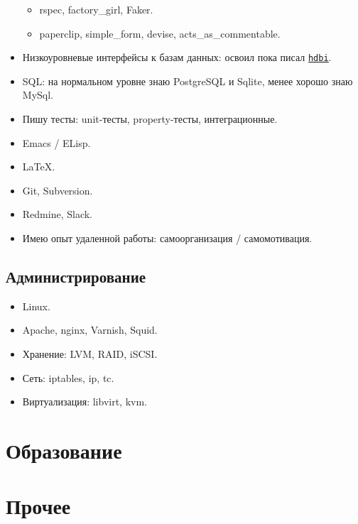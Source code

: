 \documentclass[11pt,a4paper,sans]{moderncv}
\newcommand*{\nlink}[2]{\textcolor{blue}{\texttt{\underline{\href{#1}{#2}}}}}
\begin{document}
\begin{itemize}
\begin{itemize}
  \item rspec, factory\_girl, Faker.
  \item paperclip, simple\_form, devise, acts\_as\_commentable.
  \end{itemize}
\item Низкоуровневые интерфейсы к базам данных: освоил пока писал
  \nlink{http://hackage.haskell.org/package/hdbi}{hdbi}.
\item SQL: на нормальном уровне знаю PostgreSQL и Sqlite, менее хорошо
  знаю MySql.
\item Пишу тесты: unit-тесты, property-тесты, интеграционные.
\item Emacs / ELisp.
\item \LaTeX.
\item Git, Subversion.
\item Redmine, Slack.
\item Имею опыт удаленной работы: самоорганизация / самомотивация.
\end{itemize}

\subsection{Администрирование}

\begin{itemize}
\item Linux.
\item Apache, nginx, Varnish, Squid.
\item Хранение: LVM, RAID, iSCSI.
\item Сеть: iptables, ip, tc.
\item Виртуализация: libvirt, kvm.
\end{itemize}

\section{Образование}


\section{Прочее}

\nocite{*}

\end{document}

